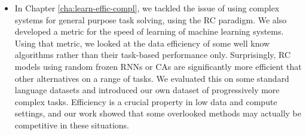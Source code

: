 \begin{itemize}
  \item In Chapter \ref{cha:learn-effic-compl}, we tackled the issue of using
        complex systems for general purpose task solving, using the \ac{RC}
        paradigm. We also developed a metric for the speed of learning of
        machine learning systems. Using that metric, we looked at the data
        efficiency of some well know algorithms rather than their task-based
        performance only. Surprisingly, \ac{RC} models using random frozen
        \acp{RNN} or \acp{CA} are significantly more efficient that other
        alternatives on a range of tasks. We evaluated this on some standard
        language datasets and introduced our own dataset of progressively more
        complex tasks. Efficiency is a crucial property in low data and compute
        settings, and our work showed that some overlooked methods may actually
        be competitive in these situations.
\end{itemize}

